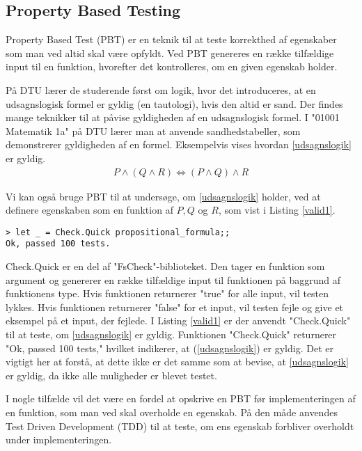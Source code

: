 \subsection{Property Based Testing}
Property Based Test (PBT) er en teknik til at teste korrekthed af egenskaber som man ved altid skal være opfyldt. Ved PBT genereres en række tilfældige input til en funktion, hvorefter det kontrolleres, om en given egenskab holder. 

På DTU lærer de studerende først om logik, hvor det introduceres, at en udsagnslogisk formel er gyldig (en tautologi), hvis den altid er sand. Der findes mange teknikker til at påvise gyldigheden af en udsagnslogisk formel. I "01001 Matematik 1a" på DTU lærer man at anvende sandhedstabeller, som demonstrerer gyldigheden af en formel. Eksempelvis vises hvordan \eqref{udsagnslogik} er gyldig.
\begin{gather}
    P \land (Q \land R) \iff (P \land Q) \land R
    \label{udsagnslogik}
\end{gather}

Vi kan også bruge PBT til at undersøge, om \eqref{udsagnslogik} holder, ved at definere egenskaben som en funktion af $P, Q$ og $R$, som vist i Listing \ref{valid1}.



\begin{lstlisting}[style=output, label={lst:output_example}, caption={Output ved PBT af (\ref{udsagnslogik})}]
> let _ = Check.Quick propositional_formula;;
Ok, passed 100 tests.
\end{lstlisting}

Check.Quick er en del af "FsCheck"-biblioteket. Den tager en funktion som argument og genererer en række tilfældige input til funktionen på baggrund af funktionens type. Hvis funktionen returnerer "true" for alle input, vil testen lykkes. Hvis funktionen returnerer "false" for et input, vil testen fejle og give et eksempel på et input, der fejlede. I Listing \ref{valid1} er der anvendt "Check.Quick" til at teste, om \eqref{udsagnslogik} er gyldig. Funktionen "Check.Quick" returnerer "Ok, passed 100 tests," hvilket indikerer, at (\ref{udsagnslogik}) er gyldig. Det er vigtigt her at forstå, at dette ikke er det samme som at bevise, at \eqref{udsagnslogik} er gyldig, da ikke alle muligheder er blevet testet.

I nogle tilfælde vil det være en fordel at opskrive en PBT før implementeringen af en funktion, som man ved skal overholde en egenskab. På den måde anvendes Test Driven Development (TDD) til at teste, om ens egenskab forbliver overholdt under implementeringen.
